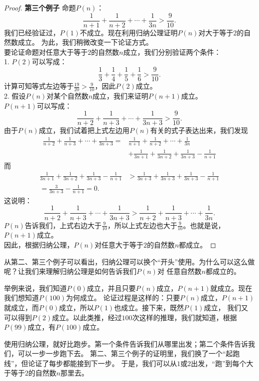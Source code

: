 \documentclass[12pt,UTF8]{ctexbook}
\begin{document}
\begin{proof}{\textbf{第三个例子 }}
    命题$P(n)$：
    $$ \frac{1}{n+1} + \frac{1}{n+2} + \cdots + \frac{1}{3n} > \frac{9}{10}. $$
    我们已经验证过，$P(1)$不成立。现在利用归纳公理证明$P(n)$对大于等于$2$的自然数成立。
    为此，我们稍微改变一下论证方式。\\
    要论证命题对任意大于等于$2$的自然数$n$成立，我们分别验证两个条件：\\
    1. $P(2)$可以写成：
    $$\frac13 + \frac14 + \frac15 + \frac16 > \frac{9}{10}.$$
    计算可知等式左边等于$\frac{19}{20} > \frac{9}{10}$，因此$P(2)$成立。\\
    2. 假设$P(n)$对某个自然数$n$成立，我们来证明$P(n+1)$成立。\\
    $P(n+1)$可以写成：
    $$ \frac{1}{n+2} + \frac{1}{n+3} + \cdots + \frac{1}{3n+3} > \frac{9}{10}. $$
    由于$P(n)$成立，我们试着把上式左边用$P(n)$有关的式子表达出来，我们发现
    \begin{align*}
        \frac{1}{n+2} + \frac{1}{n+3} + \cdots + \frac{1}{3n+3} =& \frac{1}{n+1} + \frac{1}{n+2} + \cdots + \frac{1}{3n}  \\
        &+ \frac{1}{3n+1} + \frac{1}{3n+2} + \frac{1}{3n+3} - \frac{1}{n+1}  
    \end{align*}
    而
    \begin{align*}
        \frac{1}{3n+1} + \frac{1}{3n+2} + \frac{1}{3n+3} - \frac{1}{n+1} &>  \frac{1}{3n+3} + \frac{1}{3n+3} + \frac{1}{3n+3} - \frac{1}{n+1}  \\
        = \frac{3}{3n+3} - \frac{1}{n+1} = 0.  
    \end{align*}
    这说明：
    $$ \frac{1}{n+2} + \frac{1}{n+3} + \cdots + \frac{1}{3n+3} > \frac{1}{n+2} + \frac{1}{n+3} + \cdots + \frac{1}{3n}. $$
    $P(n)$告诉我们，上式右边大于$\frac{9}{10}$，所以上式左边也大于$\frac{9}{10}$。也就是说，$P(n+1)$成立。\\
    因此，根据归纳公理，$P(n)$对任意大于等于$2$的自然数$n$都成立。    
\end{proof}
从第二、第三个例子可以看出，归纳公理可以换个“开头”使用。为什么可以这么做呢？让我们来理解归纳公理是如何告诉我们$P(n)$对
任意自然数$n$都成立的。

举例来说，我们知道$P(0)$成立，并且只要$P(n)$成立，$P(n+1)$就成立。现在我们想知道$P(100)$为何成立。
论证过程是这样的：只要$P(n)$成立，$P(n+1)$就成立，而$P(0)$成立，所以$P(1)$也成立。接下来，既然$P(1)$成立，
我们又可以得到$P(2)$成立。以此类推，经过$100$次这样的推理，我们就知道，根据$P(99)$成立，有$P(100)$成立。

使用归纳公理，就好比跑步。第一个条件告诉我们从哪里出发；第二个条件告诉我们，可以一步一步跑下去。
第二、第三个例子的证明里，我们换了一个“起跑线”，但论证了每步都能接到下一步。
于是，我们可以从$1$或$2$出发，“跑”到每个大于等于$2$的自然数$n$那里去。
\end{document}

